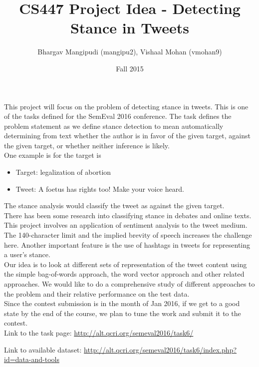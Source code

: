 \documentclass{article}
\title{CS447 Project Idea - Detecting Stance in Tweets}
\author{Bhargav Mangipudi (mangipu2), Vishaal Mohan (vmohan9)}
\date{Fall 2015}
\begin{document}
\maketitle

This project will focus on the problem of detecting stance in tweets. This is one of the tasks defined for the SemEval 2016 conference. The task defines the problem statement as we define stance detection to mean automatically determining from text whether the author is in favor of the given target, against the given target, or whether neither inference is likely. \\

One example is for the target is 
\begin{itemize}
\item Target: legalization of abortion
\item Tweet: A foetus has rights too! Make your voice heard.
\end{itemize}

The stance analysis would classify the tweet as against the given target. \\

There has been some research into classifying stance in debates \cite{Hasan2013,Kiritchenko2014} and online texts\cite{PranavAn}. This project involves an application of sentiment analysis to the tweet medium. The 140-character limit and the implied brevity of speech increases the challenge here. Another important feature is the use of hashtags in tweets for representing a user’s stance. \\

Our idea is to look at different sets of representation of the tweet content using the simple bag-of-words approach, the word vector approach \cite{Mikolov2013b, Mikolov2013, Mikolov2013a} and other related approaches. We would like to do a comprehensive study of different approaches to the problem and their relative performance on the test data. \\

Since the contest submission is in the month of Jan 2016, if we get to a good state by the end of the course, we plan to tune the work and submit it to the contest. \\

Link to the task page: \url{http://alt.qcri.org/semeval2016/task6/}

Link to available dataset: \url{http://alt.qcri.org/semeval2016/task6/index.php?id=data-and-tools}
\\
\end{document}
